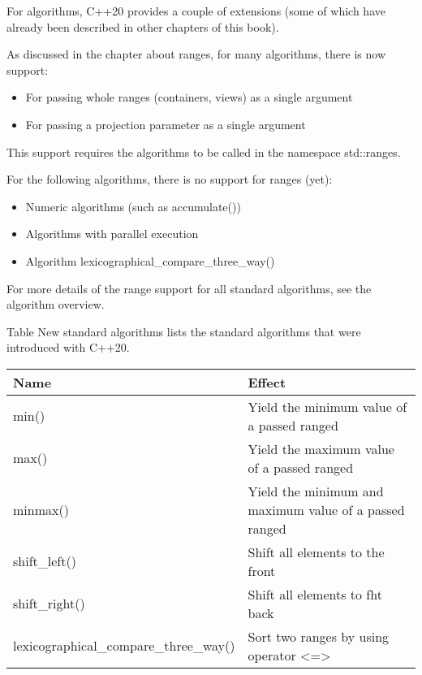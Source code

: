 

For algorithms, C++20 provides a couple of extensions (some of which have already been described in other chapters of this book).


As discussed in the chapter about ranges, for many algorithms, there is now support:

\begin{itemize}
\item 
For passing whole ranges (containers, views) as a single argument

\item 
For passing a projection parameter as a single argument
\end{itemize}

This support requires the algorithms to be called in the namespace std::ranges.

For the following algorithms, there is no support for ranges (yet):

\begin{itemize}
\item 
Numeric algorithms (such as accumulate())

\item 
Algorithms with parallel execution

\item 
Algorithm lexicographical\_compare\_three\_way()
\end{itemize}

For more details of the range support for all standard algorithms, see the algorithm overview.


Table New standard algorithms lists the standard algorithms that were introduced with C++20.

\begin{longtable}[c]{|l|l|}
\hline
\textbf{Name}  & \textbf{Effect}                            \\ \hline
\endfirsthead
%
\endhead
%
min()          & Yield the minimum value of a passed ranged \\ \hline
max()          & Yield the maximum value of a passed ranged \\ \hline
minmax()                               & Yield the minimum and maximum value of a passed ranged       \\ \hline
shift\_left()  & Shift all elements to the front            \\ \hline
shift\_right() & Shift all elements to fht back             \\ \hline
lexicographical\_compare\_three\_way() & Sort two ranges by using operator \textless{}=\textgreater{} \\ \hline
\end{longtable}

